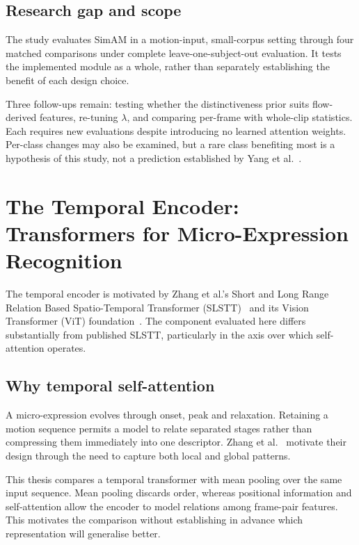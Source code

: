 \subsection{Research gap and scope}
\label{sec:simam-gap}

The study evaluates SimAM in a motion-input, small-corpus setting through four matched comparisons under complete leave-one-subject-out evaluation. It tests the implemented module as a whole, rather than separately establishing the benefit of each design choice.

Three follow-ups remain: testing whether the distinctiveness prior suits flow-derived features, re-tuning $\lambda$, and comparing per-frame with whole-clip statistics. Each requires new evaluations despite introducing no learned attention weights. Per-class changes may also be examined, but a rare class benefiting most is a hypothesis of this study, not a prediction established by Yang et al.~\cite{yang2021}.


\section{The Temporal Encoder: Transformers for Micro-Expression Recognition}
\label{sec:transformer-review}

The temporal encoder is motivated by Zhang et al.'s Short and Long Range Relation Based Spatio-Temporal Transformer (SLSTT)~\cite{zhang2022} and its Vision Transformer (ViT) foundation~\cite{dosovitskiy2021}. The component evaluated here differs substantially from published SLSTT, particularly in the axis over which self-attention operates.

\subsection{Why temporal self-attention}
\label{sec:transformer-why}

A micro-expression evolves through onset, peak and relaxation. Retaining a motion sequence permits a model to relate separated stages rather than compressing them immediately into one descriptor. Zhang et al.~\cite{zhang2022} motivate their design through the need to capture both local and global patterns.

This thesis compares a temporal transformer with mean pooling over the same input sequence. Mean pooling discards order, whereas positional information and self-attention allow the encoder to model relations among frame-pair features. This motivates the comparison without establishing in advance which representation will generalise better.

